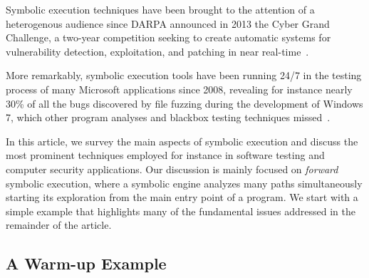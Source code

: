 
Symbolic execution techniques have been brought to the attention of a heterogenous audience since DARPA announced in 2013 the Cyber Grand Challenge, a two-year competition seeking to create automatic systems for vulnerability detection, exploitation, and patching in near real-time~\cite{ANGR-SSP16}.

More remarkably, symbolic execution tools have been running 24/7 in the testing process of many Microsoft applications since 2008, revealing for instance nearly 30\% of all the bugs discovered by file fuzzing during the development of Windows 7, which other program analyses and blackbox testing techniques missed~\cite{SAGE-QUEUE12}.

In this article, we survey the main aspects of symbolic execution and discuss the most prominent techniques employed for instance in software testing and computer security applications. Our discussion is mainly focused on {\em forward} symbolic execution, where a symbolic engine analyzes many paths simultaneously starting its exploration from the main entry point of a program.
%
We start with a simple example that highlights many of the fundamental issues addressed in the remainder of the article.

\subsection{A Warm-up Example}
\label{symbolic-execution-example}

